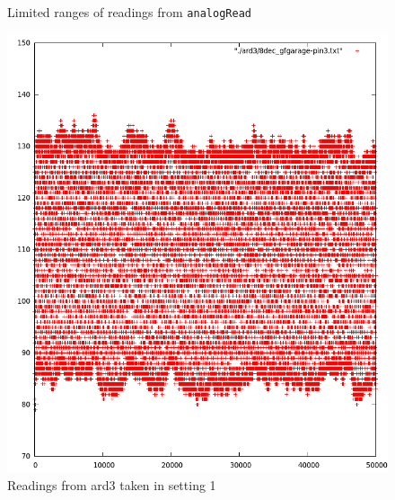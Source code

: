 \documentclass[a4paper]{article}           %
\begin{document}
\begin{figure}[h!]
  \centering  


  \caption{Limited ranges of readings from \texttt{analogRead}}
  \label{fig:ardzoom}
\end{figure}

\begin{figure}[h!]
  \centering
  \includegraphics[width=0.7\columnwidth]{img/ard3gfgarage.png}
  \caption{Readings from ard3 taken in setting 1}
  \label{fig:gfgarageard3}
\end{figure}
\end{document}
